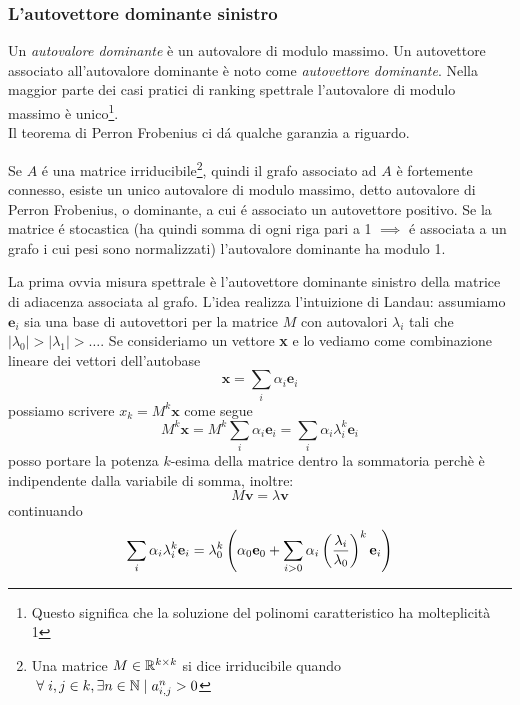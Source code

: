 \subsubsection{L'autovettore dominante sinistro}
Un \textit{autovalore dominante} è un autovalore di modulo massimo. Un autovettore associato all'autovalore dominante è noto come \textit{autovettore dominante}. Nella maggior parte dei casi pratici di ranking spettrale l'autovalore di modulo massimo è unico\footnote{Questo significa che la soluzione del polinomi caratteristico ha molteplicità 1}.\\
Il teorema di Perron Frobenius ci dá qualche garanzia a riguardo.
\begin{teo}
    Se $A$ é una matrice irriducibile\footnote{Una matrice $M \in \mathbb{R}^{k \times k}$ si dice irriducibile quando $\hspace{1mm}\forall \hspace{1mm} i, j \in k, \exists n \in \mathbb{N} \hspace{1mm}|\hspace{1mm} a_{i, j}^n > 0$}, quindi il grafo associato ad $A$ è fortemente connesso, esiste un unico autovalore di modulo massimo, detto autovalore di Perron Frobenius, o dominante, a cui é associato un autovettore positivo. Se la matrice é stocastica (ha quindi somma di ogni riga pari a 1 $\implies$ é associata a un grafo i cui pesi sono normalizzati) l'autovalore dominante ha modulo 1.  
\end{teo}
\noindent La prima ovvia misura spettrale è l'autovettore dominante sinistro della matrice di adiacenza associata al grafo. L'idea realizza l'intuizione di Landau: assumiamo $\textbf{e}_i$ sia una base di autovettori per la matrice $M$ con autovalori $\lambda_i$ tali che $|\lambda_0| > |\lambda_1| > \dots$. Se consideriamo un vettore \textbf{x} e lo vediamo come combinazione lineare dei vettori dell'autobase
\begin{equation*}
    \textbf{x} = \sum_i{\alpha_i\textbf{e}_i}
\end{equation*}
possiamo scrivere $x_k = M^k\textbf{x}$ come segue
\begin{equation*}
    M^k\textbf{x} = M^k\sum_i{\alpha_i\textbf{e}_i} = \sum_i{\alpha_i \lambda_i^k \textbf{e}_i}
\end{equation*}
posso portare la potenza $k$-esima della matrice dentro la sommatoria perchè è indipendente dalla variabile di somma, inoltre:
\begin{equation*}
    M\textbf{v} = \lambda \textbf{v}
\end{equation*}
continuando
\begin{equation*}
    \sum_i{\alpha_i \lambda_i^k \textbf{e}_i} = \lambda_0^k\left(\alpha_0\textbf{e}_0 + \sum_{i > 0}{\alpha_i\left(\frac{\lambda_i}{\lambda_0}\right)^k\textbf{e}_i}\right)
\end{equation*}
